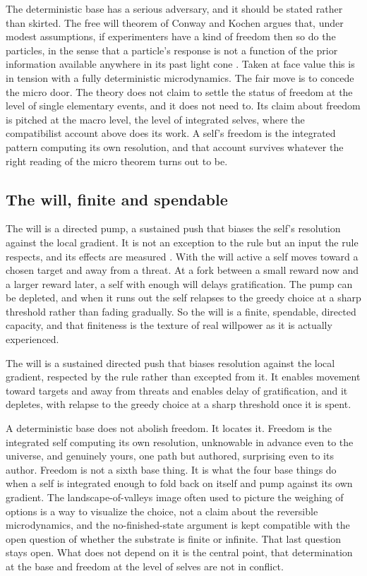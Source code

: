 The deterministic base has a serious adversary, and it should be stated rather than skirted. The free will theorem
of Conway and Kochen argues that, under modest assumptions, if experimenters have a kind of freedom then so do the
particles, in the sense that a particle's response is not a function of the prior information available anywhere in
its past light cone \cite{conwaykochen2009}. Taken at face value this is in tension with a fully deterministic
microdynamics. The fair move is to concede the micro door. The theory does not claim to settle the status of
freedom at the level of single elementary events, and it does not need to. Its claim about freedom is pitched at
the macro level, the level of integrated selves, where the compatibilist account above does its work. A self's
freedom is the integrated pattern computing its own resolution, and that account survives whatever the right
reading of the micro theorem turns out to be.

\subsection{The will, finite and spendable}

The will is a directed pump, a sustained push that biases the self's resolution against the local gradient. It is
not an exception to the rule but an input the rule respects, and its effects are measured \cite{pollard2026vibetest}.
With the will active a self moves toward a chosen target and away from a threat. At a fork between a small reward
now and a larger reward later, a self with enough will delays gratification. The pump can be depleted, and when it
runs out the self relapses to the greedy choice at a sharp threshold rather than fading gradually. So the will is a
finite, spendable, directed capacity, and that finiteness is the texture of real willpower as it is actually
experienced.

\begin{proposition}
The will is a sustained directed push that biases resolution against the local gradient, respected by the rule
rather than excepted from it. It enables movement toward targets and away from threats and enables delay of
gratification, and it depletes, with relapse to the greedy choice at a sharp threshold once it is spent.
\end{proposition}


A deterministic base does not abolish freedom. It locates it. Freedom is the integrated self computing its own
resolution, unknowable in advance even to the universe, and genuinely yours, one path but authored, surprising even
to its author. Freedom is not a sixth base thing. It is what the four base things do when a self is integrated
enough to fold back on itself and pump against its own gradient. The landscape-of-valleys image often used to
picture the weighing of options is a way to visualize the choice, not a claim about the reversible microdynamics,
and the no-finished-state argument is kept compatible with the open question of whether the substrate is finite or
infinite. That last question stays open. What does not depend on it is the central point, that determination at the
base and freedom at the level of selves are not in conflict.
